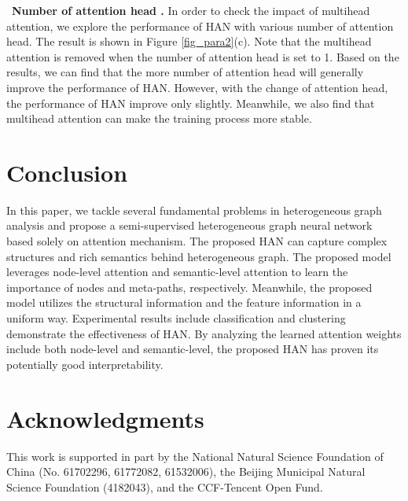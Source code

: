 \textbullet\  \textbf{Number of attention head .} In order to check the impact of multihead attention, we explore the performance of HAN with various number of attention head. The result is shown in Figure \ref{fig_para2}(c). Note that the multihead attention is removed when the number of attention head is set to 1. Based on the results, we can find that the more number of attention head will generally improve the performance of HAN. However, with the change of attention head, the performance of HAN improve only slightly.
	Meanwhile, we also find that multihead attention can make the training process more stable. 
	
















\section{Conclusion}
In this paper, we tackle several fundamental problems in heterogeneous graph analysis and propose a semi-supervised heterogeneous graph neural network based solely on attention mechanism.
The proposed HAN can capture complex structures and rich semantics behind heterogeneous graph.
The proposed model leverages node-level attention and semantic-level attention to learn the importance of nodes and meta-paths, respectively. 
Meanwhile, the proposed model utilizes the structural information and the feature information in a uniform way.
Experimental results include classification and clustering 
demonstrate the effectiveness of HAN. By analyzing the learned attention weights include both node-level and semantic-level, 
the proposed HAN has proven its potentially good interpretability.



\section{Acknowledgments}
This work is supported in part by the National Natural Science Foundation of China (No. 61702296, 61772082,  61532006), the Beijing Municipal Natural Science Foundation (4182043), and the CCF-Tencent Open Fund.






